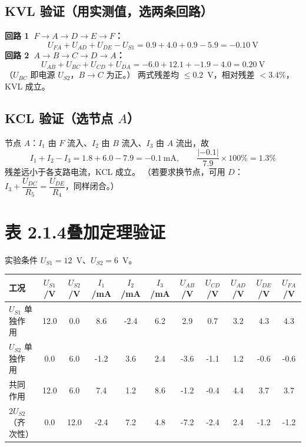 \documentclass[UTF8,a4paper,10.5pt]{ctexart}
\newcommand{\ok}[1]{\textcolor{okc}{#1}}
\begin{document}
\subsection*{KVL 验证（用实测值，选两条回路）}
\noindent\textbf{回路 1\ $F\to A\to D\to E\to F$：}
\[
U_{FA}+U_{AD}+U_{DE}-U_{S1}=0.9+4.0+0.9-5.9=-0.10\ \text{V}
\]
\noindent\textbf{回路 2\ $A\to B\to C\to D\to A$：}
\[
U_{AB}+U_{BC}+U_{CD}+U_{DA}=-6.0+12.1+-1.9-4.0=0.20\ \text{V}
\]
（$U_{BC}$ 即电源 $U_{S2}$，$B\to C$ 为正。）
两式残差均 $\le0.2$~V，相对残差 $<3.4\%$，\ok{KVL 成立}。

\subsection*{KCL 验证（选节点 $A$）}
节点 $A$：$I_1$ 由 $F$ 流入、$I_2$ 由 $B$ 流入、$I_3$ 由 $A$ 流出，故
\[
I_1+I_2-I_3=1.8+6.0-7.9=-0.1\ \text{mA},
\qquad \frac{|-0.1|}{7.9}\times100\%=1.3\%
\]
残差远小于各支路电流，\ok{KCL 成立}。
（若要求换节点，可用 $D$：$I_3+\dfrac{U_{DC}}{R_5}=\dfrac{U_{DE}}{R_4}$，同样闭合。）

\section{表 2.1.4\quad 叠加定理验证}
实验条件 $U_{S1}=12$~V、$U_{S2}=6$~V。

\begin{center}
\scriptsize\setlength{\tabcolsep}{2.8pt}
\begin{tabular}{@{}l*{10}{c}@{}}
\toprule
工况 & $U_{S1}$/V & $U_{S2}$/V & $I_1$/mA & $I_2$/mA & $I_3$/mA & $U_{AB}$/V & $U_{CD}$/V & $U_{AD}$/V & $U_{DE}$/V & $U_{FA}$/V\\
\midrule
$U_{S1}$ 单独作用 & 12.0 & 0.0 & 8.6 & -2.4 & 6.2 & 2.9 & 0.7 & 3.2 & 4.3 & 4.3 \\
$U_{S2}$ 单独作用 & 0.0 & 6.0 & -1.2 & 3.6 & 2.4 & -3.6 & -1.1 & 1.2 & -0.6 & -0.6 \\
共同作用 & 12.0 & 6.0 & 7.4 & 1.2 & 8.6 & -1.2 & -0.4 & 4.4 & 3.7 & 3.7 \\
$2U_{S2}$（齐次性） & 0.0 & 12.0 & -2.4 & 7.2 & 4.8 & -7.2 & -2.4 & 2.4 & -1.2 & -1.2 \\
\bottomrule
\end{tabular}
\end{center}
\end{document}
